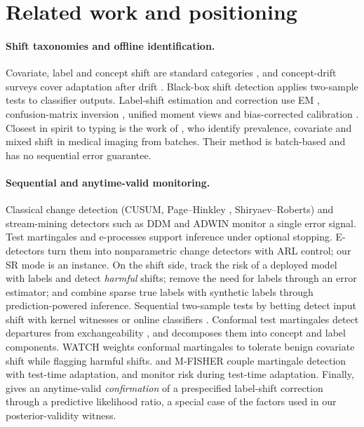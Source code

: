 \section{Related work and positioning}
\label{sec:related}

\paragraph{Shift taxonomies and offline identification.} Covariate, label and concept shift are standard categories \citep{quinonero2009,moreno2012}, and concept-drift surveys cover adaptation after drift \citep{gama2014,lu2019}. Black-box shift detection \citep[BBSD;][]{rabanser2019} applies two-sample tests to classifier outputs. Label-shift estimation and correction use EM \citep{saerens2002}, confusion-matrix inversion \citep{lipton2018}, unified moment views \citep{garg2020} and bias-corrected calibration \citep{alexandari2020}. Closest in spirit to typing is the work of \citet{roschewitz2025}, who identify prevalence, covariate and mixed shift in medical imaging from batches. Their method is batch-based and has no sequential error guarantee.

\paragraph{Sequential and anytime-valid monitoring.} Classical change detection (CUSUM, Page--Hinkley \citep{page1954}, Shiryaev--Roberts) and stream-mining detectors such as DDM \citep{gama2004ddm} and ADWIN \citep{bifet2007adwin} monitor a single error signal. Test martingales and e-processes \citep{ville1939,howard2020,vovk2021,ramdas2023,waudbysmith2024} support inference under optional stopping. E-detectors \citep{shin2024edetectors} turn them into nonparametric change detectors with ARL control; our SR mode is an instance. On the shift side, \citet{podkopaev2022} track the risk of a deployed model with labels and detect \emph{harmful} shifts; \citet{amoukou2024} remove the need for labels through an error estimator; and \citet{zhang2026ppr} combine sparse true labels with synthetic labels through prediction-powered inference. Sequential two-sample tests by betting detect input shift with kernel witnesses \citep{shekhar2023} or online classifiers \citep{jang2022}. Conformal test martingales detect departures from exchangeability \citep{vovk2021retrain}, and \citet{vovk2020concept} decomposes them into concept and label components. WATCH \citep{prinster2025watch} weights conformal martingales to tolerate benign covariate shift while flagging harmful shifts. \citet{bar2024poem} and M-FISHER \citep{khan2025mfisher} couple martingale detection with test-time adaptation, and \citet{schirmer2025} monitor risk during test-time adaptation. Finally, \citet{choi2026confirm} gives an anytime-valid \emph{confirmation} of a prespecified label-shift correction through a predictive likelihood ratio, a special case of the factors used in our posterior-validity witness.

